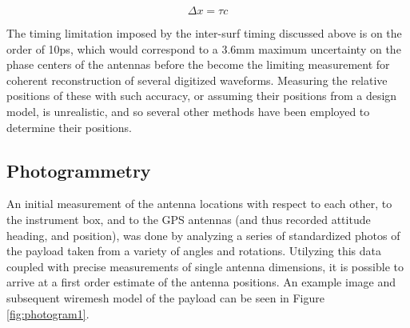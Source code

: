 	\begin{figure}[h]
	\begin{equation}
		\Delta x = \tau c
	\end{equation}
	\label{eqn:lightTravel}
	\end{figure}
	
	The timing limitation imposed by the inter-surf timing discussed above is on the order of 10ps, which would correspond to a 3.6mm maximum uncertainty on the phase centers of the antennas before the become the limiting measurement for coherent reconstruction of several digitized waveforms.  Measuring the relative positions of these with such accuracy, or assuming their positions from a design model, is unrealistic, and so several other methods have been employed to determine their positions.
	
	\subsection{Photogrammetry}
		An initial measurement of the antenna locations with respect to each other, to the instrument box, and to the GPS antennas (and thus recorded attitude heading, and position), was done by analyzing a series of standardized photos of the payload taken from a variety of angles and rotations.  Utilyzing this data coupled with precise measurements of single antenna dimensions, it is possible to arrive at a first order estimate of the antenna positions.  An example image and subsequent wiremesh model of the payload can be seen in Figure \ref{fig:photogram1}.
		
